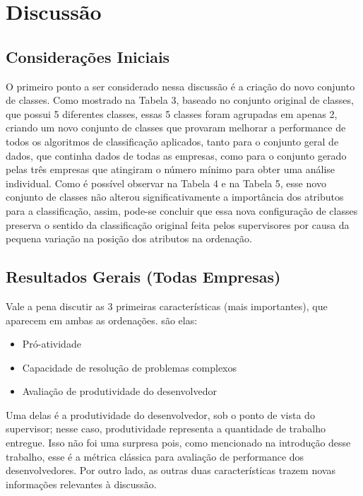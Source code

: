 \chapter[Discussão]{Discussão}

\section{Considerações Iniciais}
O primeiro ponto a ser considerado nessa discussão é a criação do novo conjunto de classes. Como mostrado na Tabela 3, baseado no conjunto original de classes, que possui 5 diferentes classes, essas 5 classes foram agrupadas em apenas 2, criando um novo conjunto de classes que provaram melhorar a performance de todos os algoritmos de classificação aplicados, tanto para o conjunto geral de dados, que continha dados de todas as empresas, como para o conjunto gerado pelas três empresas que atingiram o número mínimo para obter uma análise individual. Como é possível observar na Tabela 4 e na Tabela 5, esse novo conjunto de classes não alterou significativamente a importância dos atributos para a classificação, assim, pode-se concluir que essa nova configuração de classes preserva o sentido da classificação original feita pelos supervisores por causa da pequena variação na posição dos atributos na ordenação.

\section{Resultados Gerais (Todas Empresas)}

Vale a pena discutir as 3 primeiras características (mais importantes), que aparecem em ambas as ordenações. são elas:

\begin{itemize}
	\item Pró-atividade
	\item Capacidade de resolução de problemas complexos
	\item Avaliação de produtividade do desenvolvedor
\end{itemize}


Uma delas é a produtividade do desenvolvedor, sob o ponto de vista do supervisor; nesse caso, produtividade representa a quantidade de trabalho entregue. Isso não foi uma surpresa pois, como mencionado na introdução desse trabalho, esse é a métrica clássica para avaliação de performance dos desenvolvedores. Por outro lado, as outras duas características trazem novas informações relevantes à discussão.

